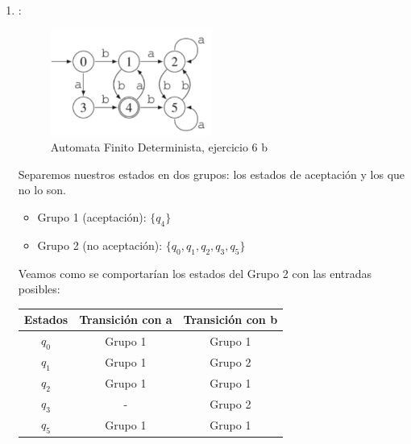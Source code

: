 \begin{enumerate}
    \item  : \\
    \begin{figure}[h!]
        \centering
        \includegraphics[width=0.5\textwidth]{images/ejercicio6b.png}
        \caption{Automata Finito Determinista, ejercicio 6 b}
    \end{figure}
    Separemos nuestros estados en dos grupos: los estados de aceptación y los que no lo son.
    \begin{itemize}
        \item Grupo 1 (aceptación): $\{q_4\}$
        \item Grupo 2 (no aceptación): $\{q_0, q_1, q_2, q_3, q_5\}$
    \end{itemize}
\newpage
    Veamos como se comportarían los estados del Grupo 2 con las entradas posibles:\\
    \begin{table}[h!]
    \centering
    \begin{tabular}{|c|c|c|}
    \hline
    \textbf{Estados} & \textbf{Transición con a} & \textbf{Transición con b } \\
    \hline
    $q_0$ & Grupo 1 & Grupo 1\\
    \hline
    $q_1$ & Grupo 1 & Grupo 2 \\
    \hline
    $q_2$  & Grupo 1 & Grupo 1 \\
    \hline
    $q_3$ & - & Grupo 2 \\
    \hline
    $q_5$ & Grupo 1 & Grupo 1 \\
    \hline
    \end{tabular}
    \label{tab:ejemplo}
    \end{table}



\end{enumerate}
